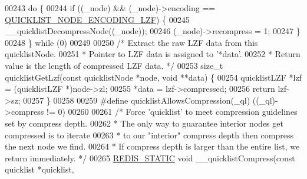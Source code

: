 \begin{DoxyCode}
{00243     \textcolor{keywordflow}{do} \textcolor{preprocessor}{\{}
00244         \textcolor{keywordflow}{if} \textcolor{preprocessor}{(}\textcolor{preprocessor}{(}\textcolor{preprocessor}{\_node}\textcolor{preprocessor}{)} \textcolor{preprocessor}{&&} \textcolor{preprocessor}{(}\textcolor{preprocessor}{\_node}\textcolor{preprocessor}{)}\textcolor{preprocessor}{->}\textcolor{preprocessor}{encoding} \textcolor{preprocessor}{==} \hyperlink{quicklist_8h_a6ce238912d4049e020b686def25c9566}{QUICKLIST\_NODE\_ENCODING\_LZF}\textcolor{preprocessor}{)} \textcolor{preprocessor}{\{}
00245             \textcolor{preprocessor}{\_\_quicklistDecompressNode}\textcolor{preprocessor}{(}\textcolor{preprocessor}{(}\textcolor{preprocessor}{\_node}\textcolor{preprocessor}{)}\textcolor{preprocessor}{)}\textcolor{preprocessor}{;}
00246             \textcolor{preprocessor}{(}\textcolor{preprocessor}{\_node}\textcolor{preprocessor}{)}\textcolor{preprocessor}{->}\textcolor{preprocessor}{recompress} \textcolor{preprocessor}{=} 1\textcolor{preprocessor}{;}
00247         \textcolor{preprocessor}{\}}
00248     \textcolor{preprocessor}{\}} \textcolor{keywordflow}{while} \textcolor{preprocessor}{(}0\textcolor{preprocessor}{)}
00249 
00250 \textcolor{comment}{/* Extract the raw LZF data from this quicklistNode.}
00251 \textcolor{comment}{ * Pointer to LZF data is assigned to '*data'.}
00252 \textcolor{comment}{ * Return value is the length of compressed LZF data. */}
00253 size\_t quicklistGetLzf(\textcolor{keyword}{const} quicklistNode *node, \textcolor{keywordtype}{void} **data) \{
00254     quicklistLZF *lzf = (quicklistLZF *)node->zl;
00255     *data = lzf->compressed;
00256     \textcolor{keywordflow}{return} lzf->sz;
00257 \}
00258 
00259 \textcolor{preprocessor}{#}\textcolor{preprocessor}{define} \textcolor{preprocessor}{quicklistAllowsCompression}\textcolor{preprocessor}{(}\textcolor{preprocessor}{\_ql}\textcolor{preprocessor}{)} \textcolor{preprocessor}{(}\textcolor{preprocessor}{(}\textcolor{preprocessor}{\_ql}\textcolor{preprocessor}{)}\textcolor{preprocessor}{->}\textcolor{preprocessor}{compress} \textcolor{preprocessor}{!=} 0\textcolor{preprocessor}{)}
00260 
00261 \textcolor{comment}{/* Force 'quicklist' to meet compression guidelines set by compress depth.}
00262 \textcolor{comment}{ * The only way to guarantee interior nodes get compressed is to iterate}
00263 \textcolor{comment}{ * to our "interior" compress depth then compress the next node we find.}
00264 \textcolor{comment}{ * If compress depth is larger than the entire list, we return immediately. */}
00265 \hyperlink{quicklist_8c_a9c22c9c899458021930a552a4f94d317}{REDIS\_STATIC} \textcolor{keywordtype}{void} \_\_quicklistCompress(\textcolor{keyword}{const} quicklist *quicklist,
}
\end{DoxyCode}
